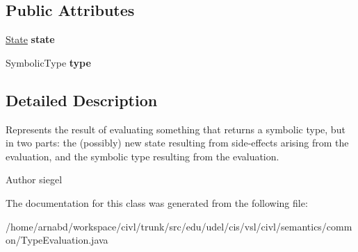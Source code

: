 \subsection*{Public Attributes}
\begin{DoxyCompactItemize}
\item 
\hypertarget{classedu_1_1udel_1_1cis_1_1vsl_1_1civl_1_1semantics_1_1common_1_1TypeEvaluation_aa4491c388e454c5a6d3cedaa030824b1}{}\hyperlink{interfaceedu_1_1udel_1_1cis_1_1vsl_1_1civl_1_1state_1_1IF_1_1State}{State} {\bfseries state}\label{classedu_1_1udel_1_1cis_1_1vsl_1_1civl_1_1semantics_1_1common_1_1TypeEvaluation_aa4491c388e454c5a6d3cedaa030824b1}

\item 
\hypertarget{classedu_1_1udel_1_1cis_1_1vsl_1_1civl_1_1semantics_1_1common_1_1TypeEvaluation_a6caba23625a837d4515d1f604d8a70fa}{}Symbolic\+Type {\bfseries type}\label{classedu_1_1udel_1_1cis_1_1vsl_1_1civl_1_1semantics_1_1common_1_1TypeEvaluation_a6caba23625a837d4515d1f604d8a70fa}

\end{DoxyCompactItemize}


\subsection{Detailed Description}
Represents the result of evaluating something that returns a symbolic type, but in two parts\+: the (possibly) new state resulting from side-\/effects arising from the evaluation, and the symbolic type resulting from the evaluation. 

\begin{DoxyAuthor}{Author}
siegel 
\end{DoxyAuthor}


The documentation for this class was generated from the following file\+:\begin{DoxyCompactItemize}
\item 
/home/arnabd/workspace/civl/trunk/src/edu/udel/cis/vsl/civl/semantics/common/Type\+Evaluation.\+java\end{DoxyCompactItemize}
